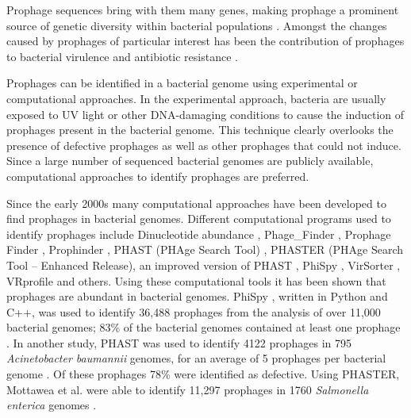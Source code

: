  Prophage sequences bring with them many genes, making prophage  a prominent source of genetic diversity within bacterial populations \cite{fortier_importance_2013}. Amongst the changes caused by prophages of particular interest has been the contribution of prophages to bacterial virulence and antibiotic resistance \cite{wagner_bacteriophage_2002,fortier_importance_2013, haaber_bacterial_2016}. 
 
Prophages can be identified in a bacterial genome using experimental or computational approaches. In the experimental approach, bacteria are usually exposed to UV light or other DNA-damaging conditions to cause the induction of prophages present in the bacterial genome. This technique clearly overlooks the presence of defective prophages as well as other prophages that could not induce.  Since a large number of sequenced bacterial genomes are publicly available, computational approaches to identify prophages are preferred.  

Since the early 2000s many computational approaches have been developed to find prophages in bacterial genomes. Different computational programs used to identify prophages include Dinucleotide abundance \citep{nicolas_mining_2002, srividhya_identification_2007}, Phage\_Finder \citep{fouts_phage_finder:_2006}, Prophage Finder \citep{bose_prophage_2006}, Prophinder \citep{lima-mendez_prophinder:_2008}, PHAST (PHAge Search Tool) \citep{zhou_phast:_2011}, PHASTER (PHAge Search Tool – Enhanced Release), an improved version of PHAST \citep{arndt_phaster:_2016},  PhiSpy \citep{akhter_phispy:_2012}, VirSorter \citep{roux_virsorter:_2015}, VRprofile \citep{li_vrprofile:_2017} and others. Using these computational tools it has been shown that prophages are abundant in bacterial genomes. PhiSpy \citep{akhter_phispy:_2012}, written in Python and C++, was used to identify 36,488 prophages from the analysis of over 11,000 bacterial genomes; 83\% of the bacterial genomes contained at least one prophage \citep{kang_prophage_2017}. In another study, PHAST \citep{zhou_phast:_2011} was used to identify 4122 prophages in 795 \textit{Acinetobacter baumannii} genomes, for an average of 5 prophages per bacterial genome \citep{costa_genomic_2018}. Of these prophages 78\% were identified as defective. Using PHASTER, Mottawea et al. were able to identify 11,297 prophages in 1760 \textit{Salmonella enterica} genomes \citep{mottawea_salmonella_2018}.

